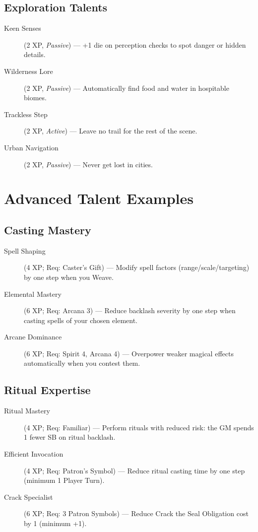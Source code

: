 \subsection*{Exploration Talents}
\begin{description}
\item[Keen Senses] (2 XP, \emph{Passive}) --- +1 die on perception checks to spot danger or hidden details.
\item[Wilderness Lore] (2 XP, \emph{Passive}) --- Automatically find food and water in hospitable biomes.
\item[Trackless Step] (2 XP, \emph{Active}) --- Leave no trail for the rest of the scene.
\item[Urban Navigation] (2 XP, \emph{Passive}) --- Never get lost in cities.
\end{description}

\section{Advanced Talent Examples}

\subsection*{Casting Mastery}
\begin{description}
\item[Spell Shaping] (4 XP; Req: Caster's Gift) --- Modify spell factors (range/scale/targeting) by one step when you Weave.
\item[Elemental Mastery] (6 XP; Req: Arcana 3) --- Reduce backlash severity by one step when casting spells of your chosen element.
\item[Arcane Dominance] (6 XP; Req: Spirit 4, Arcana 4) --- Overpower weaker magical effects automatically when you contest them.
\end{description}

\subsection*{Ritual Expertise}
\begin{description}
\item[Ritual Mastery] (4 XP; Req: Familiar) --- Perform rituals with reduced risk: the GM spends 1 fewer SB on ritual backlash.
\item[Efficient Invocation] (4 XP; Req: Patron's Symbol) --- Reduce ritual casting time by one step (minimum 1 Player Turn).
\item[Crack Specialist] (6 XP; Req: 3 Patron Symbols) --- Reduce Crack the Seal Obligation cost by 1 (minimum +1).
\end{description}

